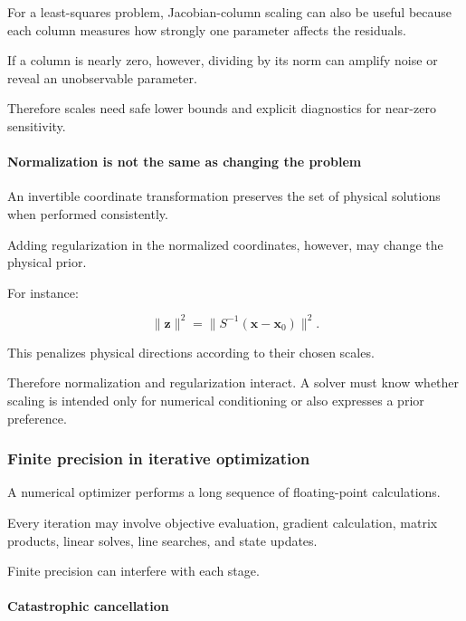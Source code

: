 For a least-squares problem, Jacobian-column scaling can also be useful because each column measures how strongly one parameter affects the residuals.

If a column is nearly zero, however, dividing by its norm can amplify noise or reveal an unobservable parameter.

Therefore scales need safe lower bounds and explicit diagnostics for near-zero sensitivity.

\paragraph{Normalization is not the same as changing the problem}\label{02-foundations-ii-ch027-normalization-is-not-the-same-as-changing-the-problem}

\hypertarget{02-foundations-ii-ch027-normalization-is-not-the-same-as-changing-the-problem}{}

An invertible coordinate transformation preserves the set of physical solutions when performed consistently.

Adding regularization in the normalized coordinates, however, may change the physical prior.

For instance:

\[
\|\mathbf z\|^2 = \|S^{-1}(\mathbf x-\mathbf x_0)\|^2.
\]

This penalizes physical directions according to their chosen scales.

Therefore normalization and regularization interact. A solver must know whether scaling is intended only for numerical conditioning or also expresses a prior preference.

\subsubsection{Finite precision in iterative optimization}\label{02-foundations-ii-ch027-finite-precision-in-iterative-optimization}

\hypertarget{02-foundations-ii-ch027-finite-precision-in-iterative-optimization}{}

A numerical optimizer performs a long sequence of floating-point calculations.

Every iteration may involve objective evaluation, gradient calculation, matrix products, linear solves, line searches, and state updates.

Finite precision can interfere with each stage.

\paragraph{Catastrophic cancellation}\label{02-foundations-ii-ch027-catastrophic-cancellation}

